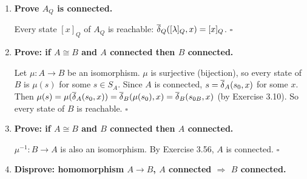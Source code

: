 \begin{enumerate}[{3.}1.]
\begin{enumerate}
\item $L$ is a union of $R$-classes: since $R$ refines $Q$, each $Q$-class is a union of $R$-classes. So $L=\bigcup(\text{some }Q\text{-classes})=\bigcup(\text{corresponding }R\text{-classes})$.

\item Homomorphism $A_R\to A_Q$: Define $\mu([x]_R)=[x]_Q$ (well-defined since $R$ refines $Q$: $[x]_R=[y]_R\Rightarrow x\,R\,y\Rightarrow x\,Q\,y\Rightarrow[x]_Q=[y]_Q$). Check: $\mu(s_{0,R})=\mu([\lambda]_R)=[\lambda]_Q=s_{0,Q}$. $\mu(\delta_R([x]_R,a))=\mu([xa]_R)=[xa]_Q=\delta_Q([x]_Q,a)=\delta_Q(\mu([x]_R),a)$. $[x]_R\in F_R\Leftrightarrow x\in L\Leftrightarrow[x]_Q\in F_Q\Leftrightarrow\mu([x]_R)\in F_Q$.

\item No homomorphism $A_Q\to A_R$ in general: $A_Q$ has fewer states than $A_R$ (since $Q$ is coarser). A homomorphism would need to be injective (by Exercise 3.21 if both reduced), but an injective map from fewer to more states can't preserve structure in general.
\end{enumerate}

\item \textbf{Prove $A_Q$ is connected.}

Every state $[x]_Q$ of $A_Q$ is reachable: $\overline{\delta}_Q([\lambda]_Q,x)=[x]_Q$. $\square$

\item \textbf{Prove: if $A\cong B$ and $A$ connected then $B$ connected.}

Let $\mu: A\to B$ be an isomorphism. $\mu$ is surjective (bijection), so every state of $B$ is $\mu(s)$ for some $s\in S_A$. Since $A$ is connected, $s=\overline{\delta}_A(s_0,x)$ for some $x$. Then $\mu(s)=\mu(\overline{\delta}_A(s_0,x))=\overline{\delta}_B(\mu(s_0),x)=\overline{\delta}_B(s_{0B},x)$ (by Exercise 3.10). So every state of $B$ is reachable. $\square$

\item \textbf{Prove: if $A\cong B$ and $B$ connected then $A$ connected.}

$\mu^{-1}: B\to A$ is also an isomorphism. By Exercise 3.56, $A$ is connected. $\square$

\item \textbf{Disprove: homomorphism $A\to B$, $A$ connected $\Rightarrow$ $B$ connected.}


\end{enumerate}
